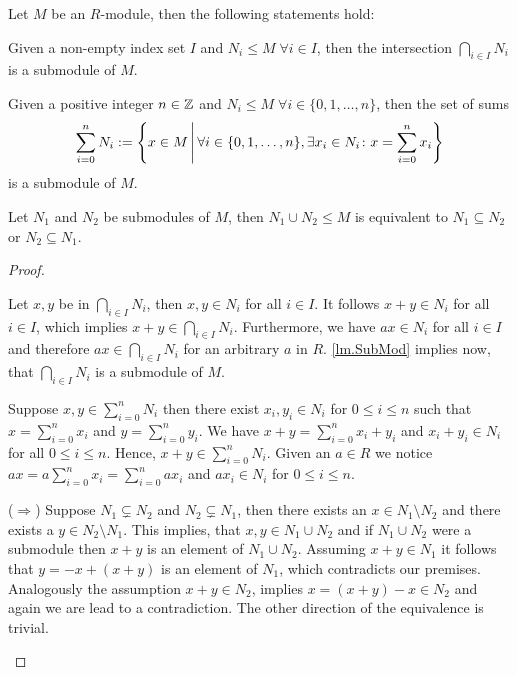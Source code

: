 \begin{lem} \label{lem.submodules}
Let $M$ be an $R$-module, then the following statements hold:
\begin{thmlist}
\item Given a non-empty index set $I$ and $N_i\leq M\;\forall i\in I$, then the intersection $\bigcap\limits_{i\in I}N_i$ is a submodule of $M$. \label{lm.IntersectionOfSubmods}
\item Given a positive integer $n\in\operatorname{\mathbb{Z}}$ and $N_i\leq M\;\forall i\in \lbrace 0,1,\ldots,n\rbrace$, then the  set of sums 
\begin{equation*}
\sum\limits_{i=0}^n N_i:=\left\lbrace x\in M\middle\arrowvert\forall i\in\lbrace 0,1,\ldots ,n\rbrace ,\exists x_i\in N_i\colon x=\sum_{i=0}^nx_i\right\rbrace
\end{equation*}
is a submodule of $M$.
\item Let $N_1$ and $N_2$ be submodules of $M$, then $N_1\cup N_2\leq M$ is equivalent to $N_1\subseteq N_2$ or $N_2\subseteq N_1$.
\end{thmlist}
\end{lem}
\begin{proof}
\begin{plist}
\item Let $x,y$ be in $\bigcap_{i\in I}N_i$, then $x,y\in N_i$ for all $i\in I$. It follows $x+y\in N_i$ for all $i\in I$, which implies $x+y\in \bigcap_{i\in I}N_i$. Furthermore, we have $a x \in N_i$ for all $i\in I$ and therefore $a x \in\bigcap_{i\in I}N_i$ for an arbitrary $a$ in $R$. \cref{lm.SubMod} implies now, that $\bigcap_{i\in I}N_i$ is a submodule of $M$.
\item Suppose $x,y\in \sum_{i=0}^n N_i$ then there exist $x_i,y_i\in N_i$ for $0\leq i\leq n$ such that $x=\sum_{i=0}^{n}x_i$ and $y=\sum_{i=0}^{n}y_i$. We have $x+y=\sum_{i=0}^{n}x_i+y_i$ and $x_i+y_i\in N_i$ for all $0\leq i\leq n$. Hence, $x+y\in \sum_{i=0}^n N_i$. Given an $a\in R$ we notice $ax=a\sum_{i=0}^{n}x_i=\sum_{i=0}^{n}ax_i$ and $ax_i\in N_i$ for $0\leq i\leq n$.
\item ($\Rightarrow$) Suppose $N_1\subsetneq N_2$ and $N_2\subsetneq N_1$, then there exists an $x\in N_1\setminus N_2$ and there exists a $y\in N_2\setminus N_1$. This implies, that $x,y\in N_1\cup N_2$ and if $N_1\cup N_2$ were a submodule then $x+y$ is an element of $N_1\cup N_2$. Assuming $x+y\in N_1$ it follows that $y=-x+(x+y)$ is an element of $N_1$, which contradicts our premises. Analogously the assumption $x+y\in N_2$, implies $x=(x+y)-x\in N_2$ and again we are lead to a contradiction. The other direction of the equivalence is trivial.
\end{plist}
\end{proof}